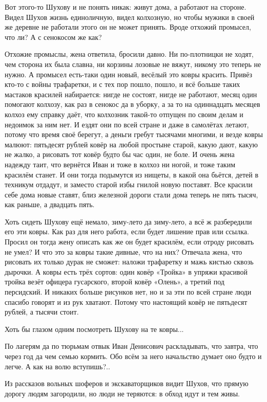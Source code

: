 Вот этого-то Шухову и не понять никак: живут дома, а работают на стороне. Видел Шухов жизнь
единоличную, видел колхозную, но чтобы мужики в своей же деревне не работали \dash этого он не
может принять. Вроде отхожий промысел, что ли? А с сенокосом же как?

Отхожие промыслы, жена ответила, бросили давно. Ни по-плотницки не ходят, чем сторона их была
славна, ни корзины лозовые не вяжут, никому это теперь не нужно. А промысел есть-таки один
новый, весёлый \dash это ковры красить. Привёз кто-то с войны трафаретки, и с тех пор пошло, пошло,
и всё больше таких мастаков красилей набирается: нигде не состоят, нигде не работают, месяц
один помогают колхозу, как раз в сенокос да в уборку, а за то на одиннадцать месяцев колхоз
ему справку даёт, что колхозник такой-то отпущен по своим делам и недоимок за ним нет. И ездят
они по всей стране и даже в самолётах летают, потому что время своё берегут, а деньги гребут
тысячами многими, и везде ковры малюют: пятьдесят рублей ковёр на любой простыне старой,
какую дают, какую не жалко, \dash а рисовать тот ковёр будто бы час один, не боле. И очень жена
надежду таит, что вернётся Иван и тоже в колхоз ни ногой, и тоже таким красилём станет. И они
тогда подымутся из нищеты, в какой она бьётся, детей в техникум отдадут, и заместо старой
избы гнилой новую поставят. Все красили себе дома новые ставят, близ железной дороги стали
дома теперь не пять тысяч, как раньше, а двадцать пять.

Хоть сидеть Шухову ещё немало, зиму-лето да зиму-лето, а всё ж разбередили его эти ковры. Как
раз для него работа, если будет лишение прав или ссылка. Просил он тогда жену описать \dash как
же он будет красилём, если отроду рисовать не умел? И что это за ковры такие дивные, что на
них? Отвечала жена, что рисовать их только дурак не сможет: наложи трафаретку и мажь кистью
сквозь дырочки. А ковры есть трёх сортов: один ковёр «Тройка» \dash в упряжи красивой тройка
везёт офицера гусарского, второй ковёр \dash «Олень», а третий \dash под персидский. И никаких
больше рисунков нет, но и за эти по всей стране люди спасибо говорят и из рук хватают. Потому
что настоящий ковёр не пятьдесят рублей, а тысячи стоит.

Хоть бы глазом одним посмотреть Шухову на те ковры...

По лагерям да по тюрьмам отвык Иван Денисович раскладывать, что завтра, что через год да чем
семью кормить. Обо всём за него начальство думает \dash оно будто и легче. А как на волю
вступишь?..

Из рассказов вольных шоферов и экскаваторщиков видит Шухов, что прямую дорогу людям
загородили, но люди не теряются: в обход идут и тем живы.


